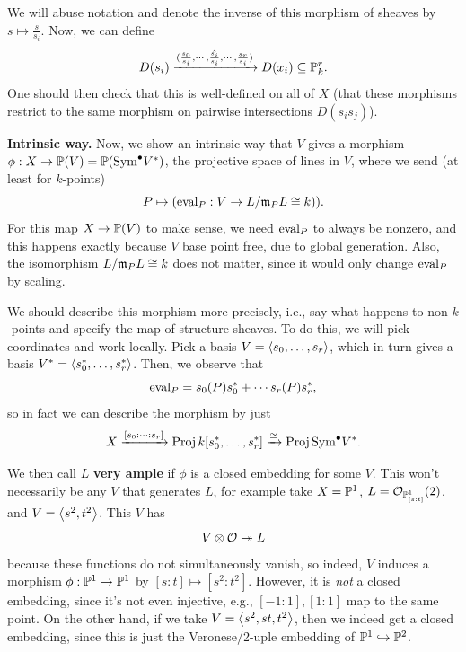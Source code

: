 \documentclass[12pt]{article}
\begin{document}
We will abuse notation and denote the inverse of this morphism of sheaves by $s\mapsto \frac{s}{s_i}$. Now, we can define
\[D(s_i) \xrightarrow{(\frac{s_0}{s_i}, \cdots, \hat{\frac{s_i}{s_i}}, \cdots, \frac{s_r}{s_i})} D(x_i) \subseteq \P^r_k.\]
One should then check that this is well-defined on all of $X$ (that these morphisms restrict to the same morphism on pairwise intersections $D(s_i s_j)$).

\textbf{Intrinsic way.} Now, we show an intrinsic way that $V$ gives a morphism $\phi: X \to \P(V) = \P(\Sym^\bullet V^*)$, the projective space of lines in $V$, where we send (at least for $k$-points)
\[P \mapsto (\eval_P:V\to L/\fm_P L\cong k)).\]
For this map $X\to \P(V)$ to make sense, we need $\eval_P$ to always be nonzero, and this happens exactly because $V$ base point free, due to global generation. Also, the isomorphism $L/\fm_P L \cong k$ does not matter, since it would only change $\eval_P$ by scaling.

We should describe this morphism more precisely, i.e., say what happens to non $k$-points and specify the map of structure sheaves. To do this, we will pick coordinates and work locally. Pick a basis $V=\<s_0,\dots,s_r\>$, which in turn gives a basis $V^*=\<s_0^*,\dots,s_r^*\>$. Then, we observe that
\[\eval_P = s_0(P) s_0^* + \cdots s_r(P) s_r^*,\]
so in fact we can describe the morphism by just
\[X \xrightarrow{[s_0: \cdots: s_r]} \Proj k[s_0^*,\dots,s_r^*] \xrightarrow{\cong} \Proj \Sym^\bullet V^*.\]

We then call $L$ \textbf{very ample} if $\phi$ is a closed embedding for some $V$. This won't necessarily be any $V$ that generates $L$, for example take $X=\P^1$, $L=\cO_{\P^1_{[s:t]}}(2)$, and $V=\<s^2,t^2\>$. This $V$ has
\[V\otimes \cO \twoheadrightarrow L\]
because these functions do not simultaneously vanish, so indeed, $V$ induces a morphism $\phi: \P^1 \to \P^1$ by $[s:t]\mapsto [s^2:t^2]$. However, it is \textit{not} a closed embedding, since it's not even injective, e.g., $[-1:1], [1:1]$ map to the same point. On the other hand, if we take $V=\<s^2,st,t^2\>$, then we indeed get a closed embedding, since this is just the Veronese/2-uple embedding of $\P^1 \hookrightarrow \P^2$.
\end{document}
